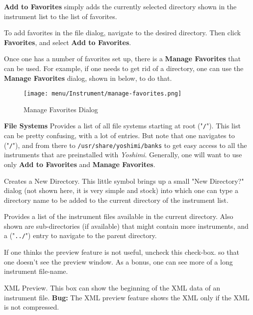    \textbf{Add to Favorites}
   simply adds the currently selected directory shown in the instrument list
   to the list of favorites.

   To add favorites in the file dialog, navigate to the desired directory.
   Then click \textbf{Favorites}, and select \textbf{Add to Favorites}.

   Once one has a number of favorites set up,
   there is a \textbf{Manage Favorites} that can be used.
   For example, if one needs to get rid of a directory, one can use the
   \textbf{Manage Favorites}
   dialog, shown in
    below,
   to do that.

\begin{figure}[H]
   \centering 
   \texttt{[image: menu/Instrument/manage-favorites.png]}
   \caption{Manage Favorites Dialog}
   \label{fig:manage_instrument_favorites}
\end{figure}

   \textbf{File Systems} 
   Provides a list of all file systems starting at root ("\texttt{/}").
   This list can be pretty confusing, with a lot of entries.
   But note that one navigates to ("\texttt{/}"), and from there to
   \texttt{/usr/share/yoshimi/banks} to get easy access to all the
   instruments that are preinstalled with
   \textsl{Yoshimi}.
   Generally, one will want to use only
   \textbf{Add to Favorites} and \textbf{Manage Favorites}.

   Creates a New Directory.
   This little symbol brings up a small "New Directory?" dialog (not shown
   here, it is very simple and stock) into which one can type a directory
   name to be added to the current directory of the instrument list.

   Provides a list of the instrument files available in the current
   directory.  Also shown are sub-directories (if available)
   that might contain more instruments, and a ("\texttt{../}") entry
   to navigate to the parent directory.

   If one thinks the preview feature is not useful, uncheck this check-box.
   so that one doesn't see the preview window.  As a bonus, one can see more
   of a long instrument file-name.

   XML Preview.
   This box can show the beginning of the XML data of an instrument file.
   \textbf{Bug:}
   The XML preview feature shows the XML only if the XML is not compressed.

